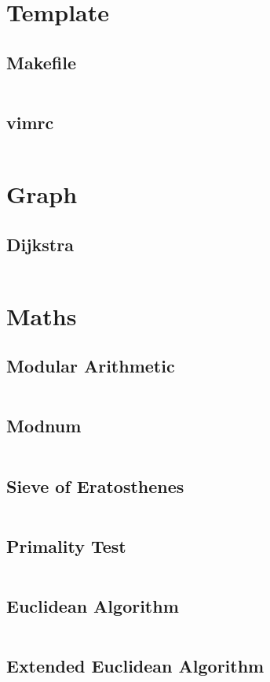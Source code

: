 \section{Template}
  \subsection{Makefile}
    \inputminted{basemake}{library/template/Makefile}
  \subsection{vimrc}
    \inputminted{vim}{library/template/.vimrc}

\section{Graph}
  \subsection{Dijkstra}
    \inputminted{cpp}{library/graphs/dijkstra.cpp}

\section{Maths}
  \subsection{Modular Arithmetic}
    \inputminted{cpp}{library/maths/mod.hpp}
  \subsection{Modnum}
    \inputminted{cpp}{library/maths/modnum.hpp}
    \subsection{Sieve of Eratosthenes}
    \inputminted{cpp}{library/maths/sieve.cpp}
    \subsection{Primality Test}
      \inputminted{cpp}{library/maths/primality.hpp}
  \subsection{Euclidean Algorithm}
    \inputminted{cpp}{library/maths/euclidean.hpp}
  \subsection{Extended Euclidean Algorithm}
    \inputminted{cpp}{library/maths/extended_euclidean.hpp}

